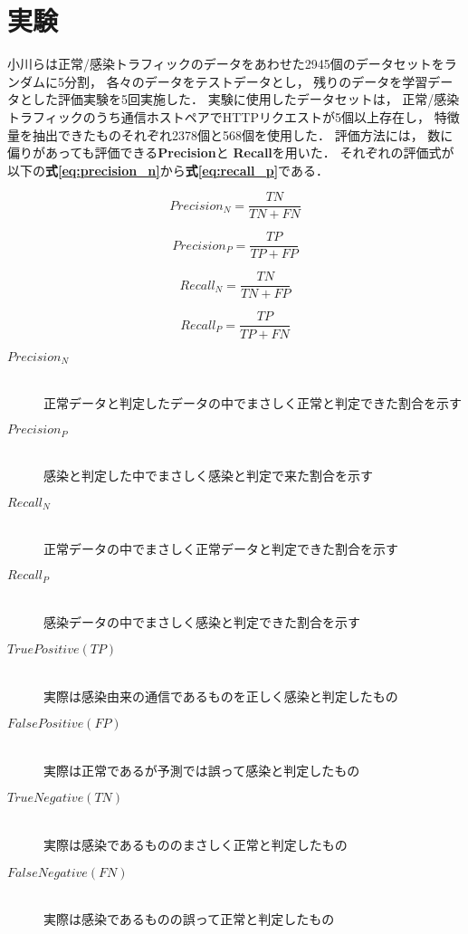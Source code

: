 \documentclass[twocolumn,10pt]{ltjsarticle}
\begin{document}
\section{実験}
小川らは正常/感染トラフィックのデータをあわせた2945個のデータセットをランダムに5分割， 各々のデータをテストデータとし， 
残りのデータを学習データとした評価実験を5回実施した． 
実験に使用したデータセットは， 正常/感染トラフィックのうち通信ホストペアでHTTPリクエストが5個以上存在し， 
特徴量を抽出できたものそれぞれ2378個と568個を使用した． 評価方法には， 数に偏りがあっても評価できる\textbf{Precision}と
\textbf{Recall}を用いた． それぞれの評価式が以下の\textbf{式\ref{eq:precision_n}}から\textbf{式\ref{eq:recall_p}}である． 

\begin{equation}
    \label{eq:precision_n}
    Precision_N = \frac{TN}{TN+FN}
\end{equation}

\begin{equation}
    \label{eq:precision_p}
    Precision_P = \frac{TP}{TP+FP}
\end{equation}

\begin{equation}
    \label{eq:recall_n}
    Recall_N = \frac{TN}{TN+FP}
\end{equation}

\begin{equation}
    \label{eq:recall_p}
    Recall_P = \frac{TP}{TP+FN}
\end{equation}

\begin{description}
    \item[$Precision_N$]~\\
    正常データと判定したデータの中でまさしく正常と判定できた割合を示す
    \item[$Precision_P$]~\\
    感染と判定した中でまさしく感染と判定で来た割合を示す
    \item[$Recall_N$]~\\
    正常データの中でまさしく正常データと判定できた割合を示す
    \item[$Recall_P$]~\\
    感染データの中でまさしく感染と判定できた割合を示す
    \item[$True Positive(TP)$]~\\
    実際は感染由来の通信であるものを正しく感染と判定したもの
    \item[$False Positive(FP)$]~\\
    実際は正常であるが予測では誤って感染と判定したもの
    \item[$True Negative(TN)$]~\\
    実際は感染であるもののまさしく正常と判定したもの
    \item[$False Negative(FN)$]~\\
    実際は感染であるものの誤って正常と判定したもの
\end{description}
\end{document}
